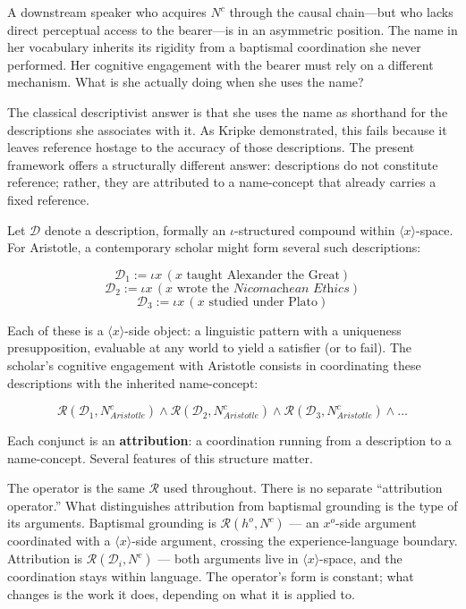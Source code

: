 \documentclass[12pt,a4paper]{article}
\begin{document}
A downstream speaker who acquires \(N^c\) through the causal chain---but who lacks direct perceptual access to the bearer---is in an asymmetric position. The name in her vocabulary inherits its rigidity from a baptismal coordination she never performed. Her cognitive engagement with the bearer must rely on a different mechanism. What is she actually doing when she uses the name?

The classical descriptivist answer is that she uses the name as shorthand for the descriptions she associates with it. As Kripke demonstrated, this fails because it leaves reference hostage to the accuracy of those descriptions. The present framework offers a structurally different answer: descriptions do not constitute reference; rather, they are attributed to a name-concept that already carries a fixed reference.

Let \(\mathcal{D}\) denote a description, formally an \(\iota\)-structured compound within \(\langle x \rangle\)-space. For Aristotle, a contemporary scholar might form several such descriptions:

\[\mathcal{D}_{1} := \iota x\,(x\text{ taught Alexander the Great})\] \[\mathcal{D}_{2} := \iota x\,(x\text{ wrote the }\textit{Nicomachean Ethics})\] \[\mathcal{D}_{3} := \iota x\,(x\text{ studied under Plato})\]

Each of these is a \(\langle x \rangle\)-side object: a linguistic pattern with a uniqueness presupposition, evaluable at any world to yield a satisfier (or to fail). The scholar's cognitive engagement with Aristotle consists in coordinating these descriptions with the inherited name-concept:

\[\mathcal{R}(\mathcal{D}_{1}, N^c_{Aristotle}) \wedge \mathcal{R}(\mathcal{D}_{2}, N^c_{Aristotle}) \wedge \mathcal{R}(\mathcal{D}_{3}, N^c_{Aristotle}) \wedge \ldots\]

Each conjunct is an \textbf{attribution}: a coordination running from a description to a name-concept. Several features of this structure matter.

The operator is the same \(\mathcal{R}\) used throughout. There is no separate ``attribution operator.'' What distinguishes attribution from baptismal grounding is the type of its arguments. Baptismal grounding is \(\mathcal{R}(h^o, N^c)\) --- an \(x^o\)-side argument coordinated with a \(\langle x \rangle\)-side argument, crossing the experience-language boundary. Attribution is \(\mathcal{R}(\mathcal{D}_i, N^c)\) --- both arguments live in \(\langle x \rangle\)-space, and the coordination stays within language. The operator's form is constant; what changes is the work it does, depending on what it is applied to.
\end{document}
